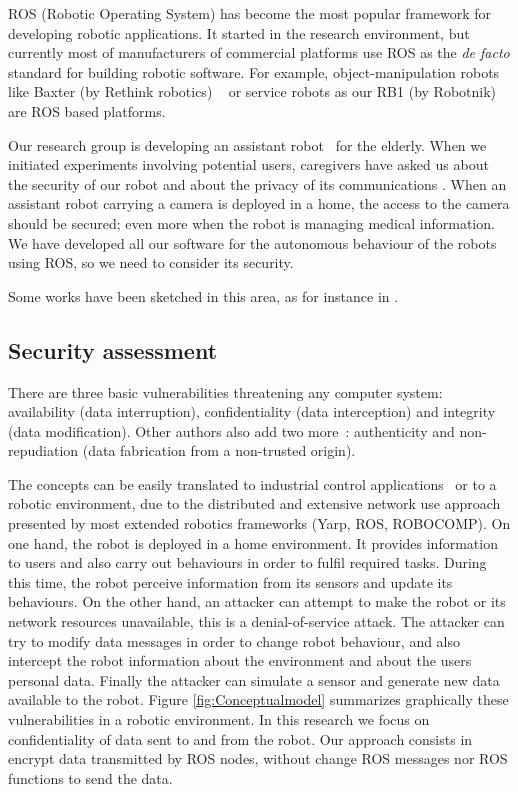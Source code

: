 \documentclass[journal,twoside]{JoPhA}
\begin{document}
ROS (Robotic Operating System) \cite{ROS09} has become the most popular framework for developing robotic applications. It started in the research environment, but currently most of manufacturers of commercial platforms use ROS as the {\em de facto} standard for building robotic software. For example, object-manipulation robots like Baxter (by Rethink robotics) ~\cite{fitzgerald2013developing} or service robots as our RB1 (by Robotnik) are ROS based platforms.

Our research group is developing an assistant robot~\cite{Martin2014} for the elderly. When we initiated experiments involving potential users, caregivers have asked us about the security of our robot and about the privacy of its communications \cite{Denning2009}. When an assistant robot carrying a camera is deployed in a home, the access to the camera should be secured; even more when the robot is managing medical information. We have developed all our software for the autonomous behaviour of the robots using ROS, so we need to consider its security.

Some works have been sketched in this area, as for instance in \cite{Guiochet2016}.



\subsection{Security assessment}

There are three basic vulnerabilities threatening any computer system: availability (data interruption), confidentiality (data interception) and integrity (data modification). Other authors also add two more~\cite{sattarova2007security}: authenticity and non-repudiation (data fabrication from a non-trusted origin). 


The concepts can be easily translated to industrial control applications~\cite{huitsing2008attack} or to a robotic environment, due to the distributed and extensive network use approach presented by most extended robotics frameworks (Yarp, ROS, ROBOCOMP). On one hand, the robot is deployed in a home environment. It provides information to users and also carry out behaviours in order to fulfil required tasks. During this time, the robot perceive information from its sensors and update its behaviours. 
On the other hand, an attacker can attempt to make the robot or its network resources unavailable, this is a denial-of-service attack. The attacker can try to modify data messages in order to change robot behaviour, and also intercept the robot information about the environment and about the users personal data. Finally the attacker can simulate a sensor and generate new data available to the robot. 
Figure \ref{fig:Conceptualmodel} summarizes graphically these vulnerabilities in a robotic environment. In this research we focus on confidentiality of data sent to and from the robot. Our approach consists in encrypt data transmitted by ROS nodes, without change ROS messages nor ROS functions to send the data. 
\end{document}
